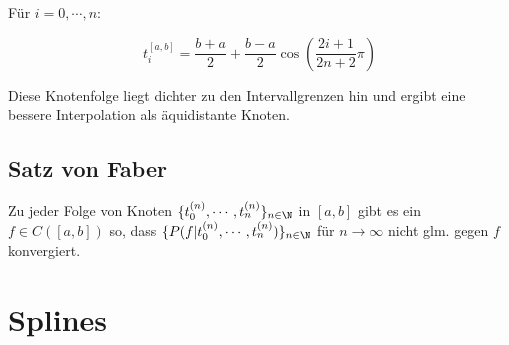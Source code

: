 Für $i = 0,\cdots,n$:

\vspace{-2mm}
$$t_i^{[a,b]} = \frac{b+a}{2} + \frac{b-a}{2} \cos\left(\frac{2i+1}{2n+2} \pi\right)$$

Diese Knotenfolge liegt dichter zu den Intervallgrenzen hin und ergibt eine bessere Interpolation als äquidistante Knoten.

\subsection*{Satz von Faber}

Zu jeder Folge von Knoten $\{t_0^{(n)},\cdots,t_n^{(n)}\}_{n \in \N}$ in $[a,b]$ gibt es ein $f \in C([a,b])$ so, dass $\{P(f|t_0^{(n)},\cdots,t_n^{(n)})\}_{n \in \N}$ für $n \to \infty$ nicht glm. gegen $f$ konvergiert.

\section*{Splines}
